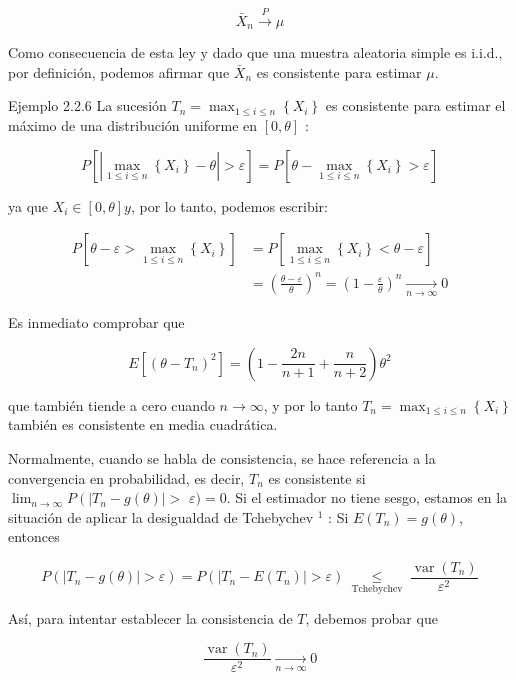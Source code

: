 \documentclass[
]{article}
\begin{document}
\[
\bar{X}_{n} \xrightarrow{P} \mu
\]

Como consecuencia de esta ley y dado que una muestra aleatoria simple es i.i.d., por definición, podemos afirmar que \(\bar{X}_{n}\) es consistente para estimar \(\mu\).

Ejemplo 2.2.6 La sucesión \(T_{n}=\max _{1 \leq i \leq n}\left\{X_{i}\right\}\) es consistente para estimar el máximo de una distribución uniforme en \([0, \theta]\) :

\[
P\left[\left|\max _{1 \leq i \leq n}\left\{X_{i}\right\}-\theta\right|>\varepsilon\right]=P\left[\theta-\max _{1 \leq i \leq n}\left\{X_{i}\right\}>\varepsilon\right]
\]

ya que \(X_{i} \in[0, \theta] y\), por lo tanto, podemos escribir:

\[
\begin{aligned}
P\left[\theta-\varepsilon>\max _{1 \leq i \leq n}\left\{X_{i}\right\}\right] & =P\left[\max _{1 \leq i \leq n}\left\{X_{i}\right\}<\theta-\varepsilon\right] \\
& =\left(\frac{\theta-\varepsilon}{\theta}\right)^{n}=\left(1-\frac{\varepsilon}{\theta}\right)^{n} \underset{n \rightarrow \infty}{\longrightarrow} 0
\end{aligned}
\]

Es inmediato comprobar que

\[
E\left[\left(\theta-T_{n}\right)^{2}\right]=\left(1-\frac{2 n}{n+1}+\frac{n}{n+2}\right) \theta^{2}
\]

que también tiende a cero cuando \(n \rightarrow \infty\), y por lo tanto \(T_{n}=\max _{1 \leq i \leq n}\left\{X_{i}\right\}\) también es consistente en media cuadrática.

Normalmente, cuando se habla de consistencia, se hace referencia a la convergencia en probabilidad, es decir, \(T_{n}\) es consistente si \(\lim _{n \rightarrow \infty} P\left(\left|T_{n}-g(\theta)\right|>\right.\) \(\varepsilon)=0\). Si el estimador no tiene sesgo, estamos en la situación de aplicar la desigualdad de Tchebychev \({ }^{1}\) :
Si \(E\left(T_{n}\right)=g(\theta)\), entonces

\[
P\left(\left|T_{n}-g(\theta)\right|>\varepsilon\right)=P\left(\left|T_{n}-E\left(T_{n}\right)\right|>\varepsilon\right) \underset{\text { Tchebychev }}{\leq} \frac{\operatorname{var}\left(T_{n}\right)}{\varepsilon^{2}}
\]

Así, para intentar establecer la consistencia de \(T\), debemos probar que

\[
\frac{\operatorname{var}\left(T_{n}\right)}{\varepsilon^{2}} \underset{n \rightarrow \infty}{\longrightarrow} 0
\]
\end{document}
